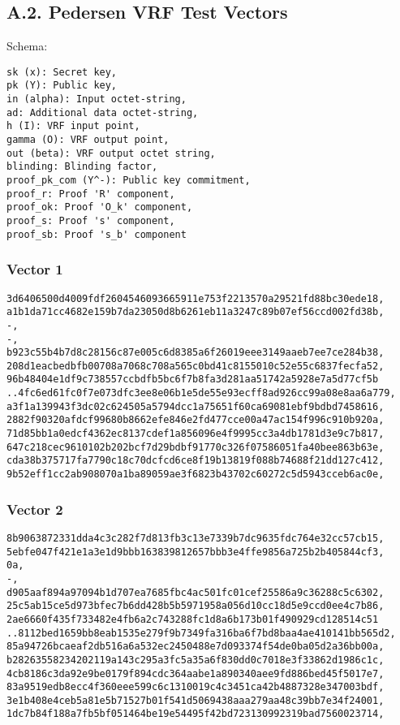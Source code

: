 \documentclass[
]{article}
\begin{document}
\hypertarget{a.2.-pedersen-vrf-test-vectors}{%
\subsection{A.2. Pedersen VRF Test
Vectors}\label{a.2.-pedersen-vrf-test-vectors}}

Schema:

\begin{verbatim}
sk (x): Secret key,
pk (Y): Public key,
in (alpha): Input octet-string,
ad: Additional data octet-string,
h (I): VRF input point,
gamma (O): VRF output point,
out (beta): VRF output octet string,
blinding: Blinding factor,
proof_pk_com (Y^-): Public key commitment,
proof_r: Proof 'R' component,
proof_ok: Proof 'O_k' component,
proof_s: Proof 's' component,
proof_sb: Proof 's_b' component
\end{verbatim}

\hypertarget{vector-1-1}{%
\subsubsection{Vector 1}\label{vector-1-1}}

\begin{verbatim}
3d6406500d4009fdf2604546093665911e753f2213570a29521fd88bc30ede18,
a1b1da71cc4682e159b7da23050d8b6261eb11a3247c89b07ef56ccd002fd38b,
-,
-,
b923c55b4b7d8c28156c87e005c6d8385a6f26019eee3149aaeb7ee7ce284b38,
208d1eacbedbfb00708a7068c708a565c0bd41c8155010c52e55c6837fecfa52,
96b48404e1df9c738557ccbdfb5bc6f7b8fa3d281aa51742a5928e7a5d77cf5b
..4fc6ed61fc0f7e073dfc3ee8e06b1e5de55e93ecff8ad926cc99a08e8aa6a779,
a3f1a139943f3dc02c624505a5794dcc1a75651f60ca69081ebf9bdbd7458616,
2882f90320afdcf99680b8662efe846e2fd477cce00a47ac154f996c910b920a,
71d85bb1a0edcf4362ec8137cdef1a856096e4f9995cc3a4db1781d3e9c7b817,
647c218cec9610102b202bcf7d29bdbf91770c326f07586051fa40bee863b63e,
cda38b375717fa7790c18c70dcfcd6ce8f19b13819f088b74688f21dd127c412,
9b52eff1cc2ab908070a1ba89059ae3f6823b43702c60272c5d5943cceb6ac0e,
\end{verbatim}

\hypertarget{vector-2-1}{%
\subsubsection{Vector 2}\label{vector-2-1}}

\begin{verbatim}
8b9063872331dda4c3c282f7d813fb3c13e7339b7dc9635fdc764e32cc57cb15,
5ebfe047f421e1a3e1d9bbb163839812657bbb3e4ffe9856a725b2b405844cf3,
0a,
-,
d905aaf894a97094b1d707ea7685fbc4ac501fc01cef25586a9c36288c5c6302,
25c5ab15ce5d973bfec7b6dd428b5b5971958a056d10cc18d5e9ccd0ee4c7b86,
2ae6660f435f733482e4fb6a2c743288fc1d8a6b173b01f490929cd128514c51
..8112bed1659bb8eab1535e279f9b7349fa316ba6f7bd8baa4ae410141bb565d2,
85a94726bcaeaf2db516a6a532ec2450488e7d093374f54de0ba05d2a36bb00a,
b28263558234202119a143c295a3fc5a35a6f830dd0c7018e3f33862d1986c1c,
4cb8186c3da92e9be0179f894cdc364aabe1a890340aee9fd886bed45f5017e7,
83a9519edb8ecc4f360eee599c6c1310019c4c3451ca42b4887328e347003bdf,
3e1b408e4ceb5a81e5b71527b01f541d5069438aaa279aa48c39bb7e34f24001,
1dc7b84f188a7fb5bf051464be19e54495f42bd723130992319bad7560023714,
\end{verbatim}
\end{document}
